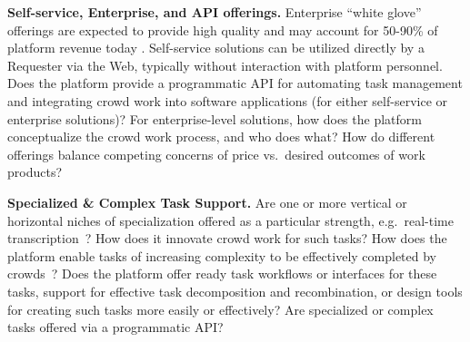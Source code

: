 \documentclass{sigchi}
\begin{document}
{\bf Self-service, Enterprise, and API offerings.} 
Enterprise ``white glove'' offerings are expected to provide high quality and may account for 50-90\% of platform revenue today \cite{Turian12}. Self-service solutions can be utilized directly by a Requester via the Web, typically without interaction with platform personnel. Does the platform provide a programmatic API for automating task management and integrating crowd work into software applications (for either self-service or enterprise solutions)? 
For enterprise-level solutions, how does the platform conceptualize the crowd work process, and who does what? 
How do different  offerings balance competing concerns of price vs.\ desired outcomes of work products?

{\bf Specialized \& Complex Task Support.} Are one or more vertical or horizontal niches of specialization offered as a particular strength, e.g.\ real-time transcription~\cite{lasecki2012real}? How does it innovate crowd work for such tasks? 
How does the platform enable tasks of increasing complexity to be effectively completed by 
crowds~\cite{noronha2011platemate,Heer10}?  
Does the platform offer ready task workflows or interfaces for these tasks, support for effective task decomposition and recombination, or design tools for creating such tasks more easily or effectively? Are specialized or complex tasks offered via a programmatic API? 
\end{document}
